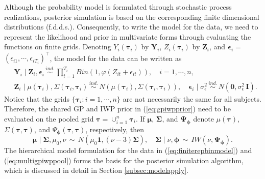 Although the probability model is formulated through stochastic process realizations, 
posterior simulation is based on the corresponding finite dimensional distributions (f.d.d.s.). 
Consequently, to write the model for the data, we need to represent the likelihood and prior 
in multivariate forms through evaluating the functions on finite grids. 
Denoting $Y_i(\boldsymbol{\tau}_i)$ by $\mathbf{Y}_i$, $Z_i(\boldsymbol{\tau}_i)$ by 
$\mathbf{Z}_i$, and $\boldsymbol{\epsilon}_i=$
$(\epsilon_{i1},\cdots,\epsilon_{iT_i})^{\top}$, the %
model for the data can be written as 
\begin{equation}
\begin{split}
&\mathbf{Y}_i\mid \mathbf{Z}_i,\boldsymbol{\epsilon}_i \, \stackrel{ind.}{\sim} \,
\prod^{T_i}_{t=1}Bin(1, \varphi(Z_{it}+\epsilon_{it})),\quad i=1,\cdots,n,\\ 
&\mathbf{Z}_i\mid \mu(\boldsymbol{\tau}_i),\Sigma(\boldsymbol{\tau}_i,\boldsymbol{\tau}_i) \,
\stackrel{ind.}{\sim} \, N(\mu(\boldsymbol{\tau}_i),\Sigma(\boldsymbol{\tau}_i,\boldsymbol{\tau}_i)),
\quad \boldsymbol{\epsilon}_i\mid \sigma_{\epsilon}^2
\, \stackrel{ind.}{\sim} \, N(\mathbf{0},\sigma_{\epsilon}^2 \, \mathbf{I}).
\end{split}
\label{eq:finiterepbinmodel}
\end{equation}
Notice that the grids $\{\boldsymbol{\tau}_i:i=1,\cdots,n\}$ are not necessarily the same
for all subjects. Therefore, the shared GP and IWP prior in (\ref{eq:gpiwpprior}) need to 
be evaluated on the pooled grid $\boldsymbol{\tau}=\cup_{i=1}^n\boldsymbol{\tau}_i$. 
If $\boldsymbol{\mu}$, $\boldsymbol{\Sigma}$, and $\boldsymbol{\Psi}_{\boldsymbol{\phi}}$ 
denote $\mu(\boldsymbol{\tau})$, $\Sigma(\boldsymbol{\tau},\boldsymbol{\tau})$, and $\Psi_{\boldsymbol{\phi}}(\boldsymbol{\tau},\boldsymbol{\tau})$, respectively, then
\begin{equation}
\boldsymbol{\mu} \mid \boldsymbol{\Sigma},\mu_{0}, \nu 
\, \sim \, N(\mu_0\mathbf{1}, (\nu-3) \boldsymbol{\Sigma}),\quad 
\boldsymbol{\Sigma} \mid \nu, \boldsymbol{\phi} 
\, \sim \, IW(\nu,\boldsymbol{\Psi}_{\boldsymbol{\phi}}).
\label{eq:multigpiwppool}
\end{equation}
The hierarchical model formulation for the data in (\ref{eq:finiterepbinmodel}) 
and (\ref{eq:multigpiwppool}) forms the basis for the posterior simulation algorithm, 
which is discussed in detail in Section \ref{subsec:modelapply}.  



